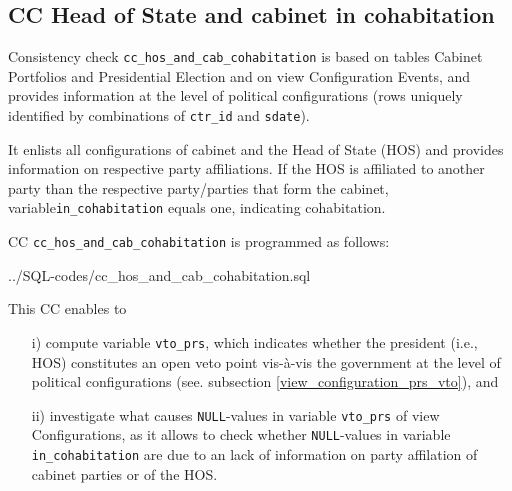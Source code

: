\subsection{CC Head of State and cabinet in cohabitation}\label{cc_hos_and_cab_cohabitation}
Consistency check \texttt{\footnotesize cc\_hos\_and\_cab\_cohabitation} is based on tables Cabinet Portfolios and Presidential Election and on view Configuration Events, and provides information at the level of political configurations (rows uniquely identified by combinations of \texttt{\footnotesize ctr\_id} and \texttt{\footnotesize sdate}).

It enlists all configurations of cabinet and the Head of State (HOS) and provides information on respective party affiliations. 
If the HOS is affiliated to another party than the respective party/parties that form the cabinet, variable\texttt{\footnotesize in\_cohabitation} equals one, indicating cohabitation.

CC \texttt{\footnotesize cc\_hos\_and\_cab\_cohabitation} is programmed as follows:

%
{../SQL-codes/cc_hos_and_cab_cohabitation.sql}

This CC enables to
\begin{itemize}
\item[i)]compute variable \texttt{\footnotesize vto\_prs}, which indicates whether the president (i.e., HOS) constitutes an open veto point vis-\`a-vis the government at the level of political configurations (see. subsection \ref{view_configuration_prs_vto}), and 
\item[ii)]investigate what causes \texttt{\footnotesize NULL}-values in variable \texttt{\footnotesize vto\_prs} of view Configurations, as it allows to check whether \texttt{\footnotesize NULL}-values in variable \texttt{\footnotesize in\_cohabitation} are due to an lack of information on party affilation of cabinet parties or of the HOS.
\end{itemize}
